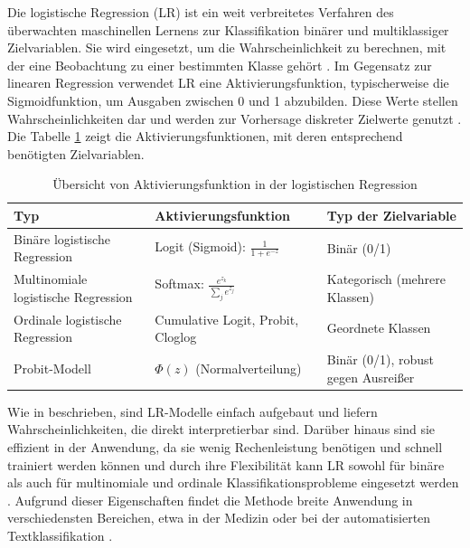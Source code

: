 Die logistische Regression (LR) ist ein weit verbreitetes Verfahren des überwachten maschinellen Lernens zur Klassifikation binärer und 
multiklassiger Zielvariablen. Sie wird eingesetzt, um die Wahrscheinlichkeit zu berechnen, mit der eine Beobachtung zu einer 
bestimmten Klasse gehört \cite{elchami2025, aslam2022, SUDHAKAR2024101028}. Im Gegensatz zur linearen Regression verwendet LR eine Aktivierungsfunktion, 
typischerweise die Sigmoidfunktion, um Ausgaben zwischen 0 und 1 abzubilden. Diese Werte stellen Wahrscheinlichkeiten dar und werden zur 
Vorhersage diskreter Zielwerte genutzt \cite{aslam2022}. Die Tabelle \ref{tab:linkfunktionen} zeigt die Aktivierungsfunktionen, mit deren entsprechend
benötigten Zielvariablen.

\begin{table}[ht]
        \renewcommand{\arraystretch}{1.3}
    \centering
        \begin{tabular}{|p{4.4cm}|p{4.4cm}|p{4.4cm}|}
        \hline
        \rowcolor{lightgray} \textbf{Typ} & \textbf{Aktivierungsfunktion} & \textbf{Typ der Zielvariable}\\
        \hline
        Binäre logistische Regression & Logit (Sigmoid): $\frac{1}{1 + e^{-z}}$ & Binär (0/1) \\
        \hline
        Multinomiale logistische Regression & Softmax: $\frac{e^{z_k}}{\sum_j e^{z_j}}$ & Kategorisch (mehrere Klassen) \\
        \hline
        Ordinale logistische Regression & Cumulative Logit, Probit, Cloglog & Geordnete Klassen \\
        \hline
        Probit-Modell & $\Phi(z)$ (Normalverteilung) & Binär (0/1), robust gegen Ausreißer \\
        \hline
        \end{tabular}
\caption{Übersicht von Aktivierungsfunktion in der logistischen Regression \cite{jurafsky2023, hastie2009, agresti2018cda}}
\label{tab:linkfunktionen}
\end{table}

Wie in \cite{aslam2022} beschrieben, sind LR-Modelle einfach aufgebaut und liefern Wahrscheinlichkeiten, die direkt interpretierbar sind. 
Darüber hinaus sind sie effizient in der Anwendung, da sie wenig Rechenleistung benötigen und schnell trainiert werden können 
und durch ihre Flexibilität kann LR sowohl für binäre als auch für multinomiale und ordinale Klassifikationsprobleme 
eingesetzt werden \cite{SUDHAKAR2024101028}. Aufgrund dieser Eigenschaften findet die Methode breite Anwendung in verschiedensten Bereichen, 
etwa in der Medizin oder bei der automatisierten Textklassifikation \cite{aslam2022, elchami2025}.

